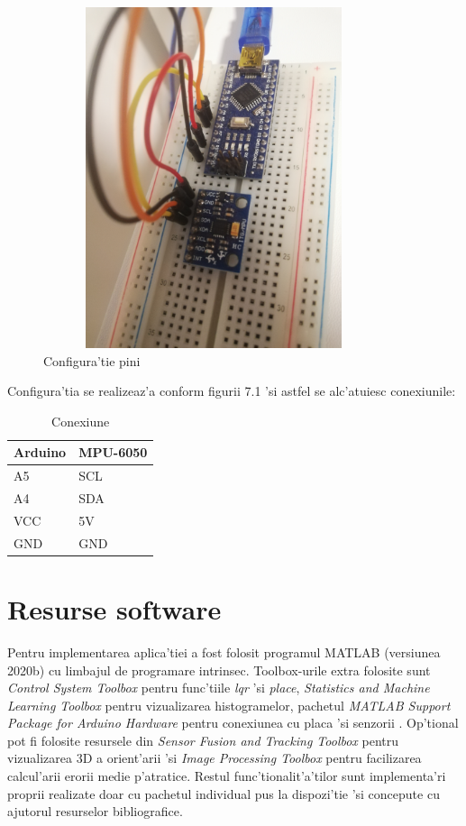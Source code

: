 \documentclass[12pt,a4paper,twoside]{report}
\begin{document}
\begin{figure}[h]
\centering
 \includegraphics[width=100mm,height=100mm,]{img/arduino}
 \caption{Configura'tie pini}
\end{figure}

Configura'tia se realizeaz'a conform figurii 7.1 'si astfel se alc'atuiesc conexiunile: 


\begin{table}[h]
\centering
\begin{tabular}{|l|l|}\hline
Arduino & MPU-6050 \\ \hline
A5 & SCL \\ \hline
A4 & SDA \\ \hline
VCC & 5V \\ \hline
GND & GND \\ \hline
\end{tabular}
\caption{Conexiune}
\label{tab:my_label}
\end{table}



\section{Resurse software}

Pentru implementarea aplica'tiei a fost folosit programul MATLAB (versiunea 2020b) cu limbajul de programare intrinsec. Toolbox-urile extra folosite sunt \textit{Control System Toolbox} pentru func'tiile \textit{lqr} 'si \textit{place}, \textit{Statistics and Machine Learning Toolbox} pentru vizualizarea histogramelor, pachetul \textit{MATLAB Support Package for Arduino Hardware} pentru conexiunea cu placa \cite{arduino} 'si senzorii \cite{mpu}. Op'tional pot fi folosite resursele din \textit{Sensor Fusion and Tracking Toolbox} pentru vizualizarea 3D a orient'arii 'si \textit{Image Processing Toolbox} pentru facilizarea calcul'arii erorii medie p'atratice. Restul func'tionalit'a'tilor sunt implementa'ri proprii realizate doar cu pachetul individual pus la dispozi'tie 'si concepute cu ajutorul resurselor bibliografice.
\end{document}

